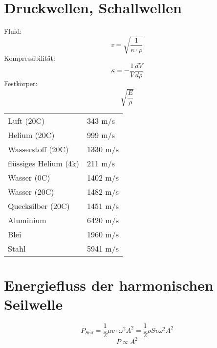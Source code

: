 \section{Druckwellen, Schallwellen}
Fluid: 
\[ \boxed{v = \sqrt{\frac{1}{\kappa \cdot \rho}}} \]
Kompressibilität: 
\[ \boxed{\kappa = -\frac{1}{V} \frac{d V}{d \rho}} \]
Festkörper: 
\[ \boxed{\sqrt{\frac{E}{\rho}}} \]
\begin{tabular}{ll}
Luft (20C) & 343 m/s \\
Helium (20C) & 999 m/s \\
Wasserstoff (20C) & 1330 m/s \\
flüssiges Helium (4k) & 211 m/s \\
Wasser (0C) & 1402 m/s \\
Wasser (20C) & 1482 m/s \\
Quecksilber (20C) & 1451 m/s \\
Aluminium & 6420 m/s \\
Blei & 1960 m/s \\
Stahl & 5941 m/s \\
\end{tabular}

\section{Energiefluss der harmonischen Seilwelle}
\[ \boxed{P_{Seil} = \frac{1}{2} \mu v \cdot \omega^2 A^2 
= \frac{1}{2} \rho S v \omega^2 A^2} \]
\[ \boxed{P \propto A^2} \]
\[ \boxed{} \]
\[ \boxed{} \]